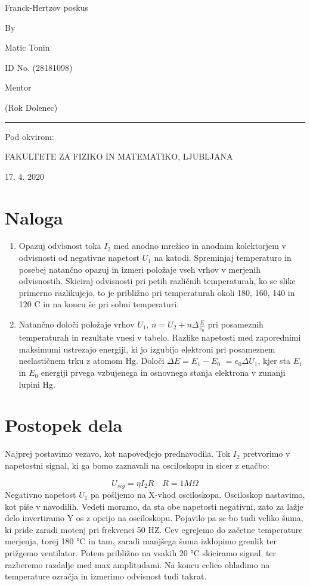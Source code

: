 \documentclass[11pt, a4paper]{article}
\theoremstyle{definition}
\theoremstyle{example}
\theoremstyle{izrek}
\begin{document}
\begin{center}
\thispagestyle{empty}
\parskip=14pt%
\vspace*{3\parskip}%
\begin{Huge} Franck-Hertzov poskus\end{Huge}

By

Matic Tonin

ID No. (28181098)

Mentor 

(Rok Dolenec)

\rule{7cm}{0.4pt}

Pod okvirom:

FAKULTETE ZA FIZIKO IN MATEMATIKO, LJUBLJANA

17. 4. 2020

\end{center}
\pagebreak
\section{Naloga}
\begin{enumerate}
\item Opazuj odvisnost toka $I_2$ med anodno mrežico in anodnim kolektorjem v odvisnosti od negativne napetost $U_1$ na katodi. Spreminjaj temperaturo in posebej natančno opazuj in izmeri položaje vseh vrhov v merjenih odvisnostih. Skiciraj odvisnosti pri petih različnih temperaturah, ko se slike primerno razlikujejo, to je približno pri temperaturah okoli 180, 160, 140 in 120 C in na koncu še pri sobni temperaturi.
\item  Natančno določi položaje vrhov $U_1$, $n = U_2+n \Delta \frac{E}{e_0}$ pri posameznih temperaturah in rezultate vnesi v tabelo. Razlike napetosti med zaporednimi maksimumi ustrezajo energiji, ki jo izgubijo elektroni pri posameznem neelastičnem trku z atomom Hg. Določi $\Delta E= E_1-E_0$ $= e_0 \Delta U_1$, kjer sta $E_1$ in $E_0$ energiji prvega vzbujenega in osnovnega stanja elektrona v zunanji lupini Hg.
\end{enumerate}

\section{Postopek dela}
Najprej postavimo vezavo, kot napovedjejo prednavodila. Tok $I_2$ pretvorimo v napetostni signal, ki ga bomo zaznavali na osciloskopu in sicer z enačbo:

$$U_{sig}=\eta I_2 R \quad R= 1 M\Omega$$
Negativno napetost $U_1$ pa pošljemo na X-vhod osciloskopa. 
Osciloskop nastavimo, kot piše v navodilih. Vedeti moramo, da sta obe napetosti negativni, zato za lažje delo invertiramo Y os z opcijo na osciloskopu. Pojavilo pa se bo tudi veliko šuma, ki pride zaradi motenj pri frekvenci 50 HZ. Cev egrejemo do začetne temperature merjenja, torej 180 °C in tam, zaradi manjšega šuma izklopimo grenlik ter prižgemo ventilator. Potem približno na vsakih 20 °C skiciramo signal, ter razberemo razdalje med max amplitudami. Na koncu celico ohladimo na temperature ozračja in izmerimo odvisnost tudi takrat.
 
\end{document}
